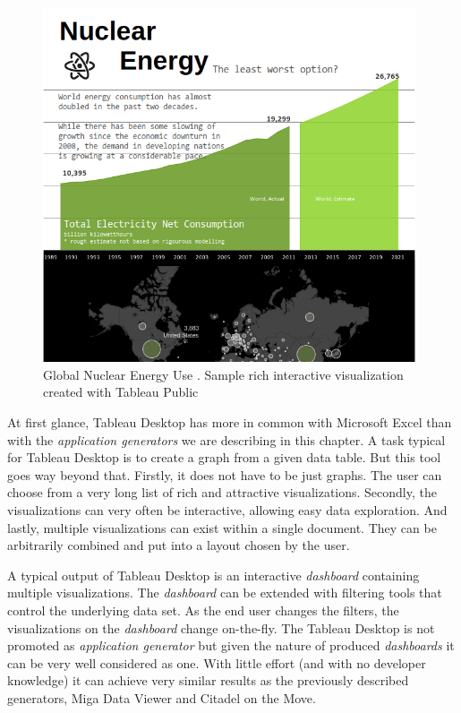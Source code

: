 \begin{figure}
	\centering
	\includegraphics[width=110mm]{img/02_tableau_sample.png}
	\caption{Global Nuclear Energy Use \cite{citadel_agt_doc}. Sample rich interactive visualization created with Tableau Public}
	\label{fig:tableau-global-nuclear-enery-use}
\end{figure}

At first glance, Tableau Desktop has more in common with Microsoft Excel than with the \emph{application generators} we are describing in this chapter. A task typical for Tableau Desktop is to create a graph from a given data table. But this tool goes way beyond that. Firstly, it does not have to be just graphs. The user can choose from a very long list of rich and attractive visualizations. Secondly, the visualizations can very often be interactive, allowing easy data exploration. And lastly, multiple visualizations can exist within a single document. They can be arbitrarily combined and put into a layout chosen by the user.

A typical output of Tableau Desktop is an interactive \emph{dashboard} containing multiple visualizations. The \emph{dashboard} can be extended with filtering tools that control the underlying data set. As the end user changes the filters, the visualizations on the \emph{dashboard} change on-the-fly. The Tableau Desktop is not promoted as \emph{application generator} but given the nature of produced \emph{dashboards} it can be very well considered as one. With little effort (and with no developer knowledge) it can achieve very similar results as the previously described generators, Miga Data Viewer and Citadel on the Move.

